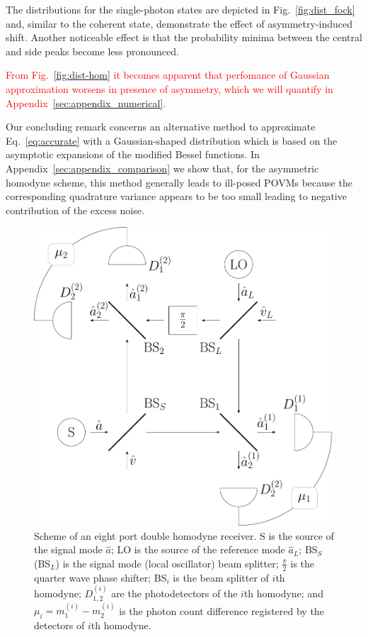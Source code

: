 \documentclass[%
reprint,
superscriptaddress,
 amsmath,amssymb,amsfonts,
 aps,
 pra,
 longbibliography
]{revtex4-2}
\begin{document}
The distributions for the single-photon states
are depicted in Fig.~\ref{fig:dist_fock}
and, similar to the coherent state,
demonstrate the effect of asymmetry-induced shift.
Another noticeable effect is that
the probability minima between the central and side peaks
become less pronounced.

\textcolor{red}{From Fig.~\ref{fig:dist-hom} it becomes apparent that perfomance of Gaussian approximation worsens in presence of asymmetry, which we will quantify in Appendix~\ref{sec:appendix_numerical}.}

Our concluding remark concerns an alternative method
to approximate Eq.~\eqref{eq:accurate}
with a Gaussian-shaped distribution
which is based on the asymptotic expansions of the modified Bessel functions.
In Appendix~\ref{sec:appendix_comparison} we show that, for the asymmetric homodyne scheme,
this method generally leads to ill-posed POVMs because
the corresponding quadrature variance
appears to be too small leading to negative
contribution of the excess noise. 
  

\begin{figure}
    \centering
    \includegraphics[width=0.9\linewidth]{pics/schemes/double_homodyne.pdf}
    \caption{Scheme of an eight port double homodyne receiver.
      S is the source of the signal mode
      $\hat{a}$; LO is the source of the reference mode $\hat{a}_{L}$;
      BS$_S$ (BS$_L$) is the signal mode (local oscillator) beam splitter;
      $\frac{\pi}{2}$ is the quarter wave phase shifter;
BS$_i$ is the beam splitter of $i$th homodyne;
$D_{1,2}^{(i)}$ are the photodetectors of the $i$th homodyne;
and $\mu_i=m_1^{(i)}-m_2^{(i)}$ is the photon count difference registered by
the detectors of $i$th homodyne.
    }
    \label{fig:double-homodyne}
\end{figure}
\end{document}
